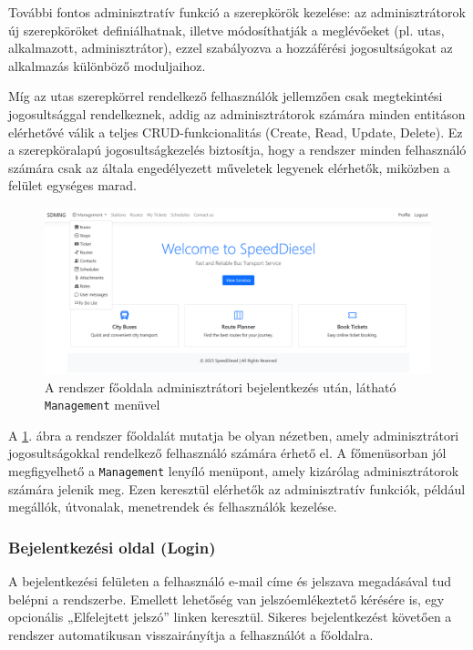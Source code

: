 \indent További fontos adminisztratív funkció a szerepkörök kezelése: az adminisztrátorok új szerepköröket definiálhatnak, illetve módosíthatják a meglévőeket (pl. utas, alkalmazott, adminisztrátor), ezzel szabályozva a hozzáférési jogosultságokat az alkalmazás különböző moduljaihoz.

\indent Míg az utas szerepkörrel rendelkező felhasználók jellemzően csak megtekintési jogosultsággal rendelkeznek, addig az adminisztrátorok számára minden entitáson elérhetővé válik a teljes CRUD-funkcionalitás (Create, Read, Update, Delete). Ez a szerepköralapú jogosultságkezelés biztosítja, hogy a rendszer minden felhasználó számára csak az általa engedélyezett műveletek legyenek elérhetők, miközben a felület egységes marad.
\begin{figure}[H]
    \centering
    \includegraphics[width=1\textwidth]{Szakdolgozat/Mellekletek/fooldal.PNG}
    \caption{A rendszer főoldala adminisztrátori bejelentkezés után, látható \texttt{Management} menüvel}
    \label{fig:admin-home}
\end{figure}

A \ref{fig:admin-home}. ábra a rendszer főoldalát mutatja be olyan nézetben, amely adminisztrátori jogosultságokkal rendelkező felhasználó számára érhető el. A főmenüsorban jól megfigyelhető a \texttt{Management} lenyíló menüpont, amely kizárólag adminisztrátorok számára jelenik meg. Ezen keresztül elérhetők az adminisztratív funkciók, például megállók, útvonalak, menetrendek és felhasználók kezelése.

\subsubsection{Bejelentkezési oldal (Login)}

A bejelentkezési felületen a felhasználó e-mail címe és jelszava megadásával tud belépni a rendszerbe. Emellett lehetőség van jelszóemlékeztető kérésére is, egy opcionális „Elfelejtett jelszó” linken keresztül. Sikeres bejelentkezést követően a rendszer automatikusan visszairányítja a felhasználót a főoldalra.


